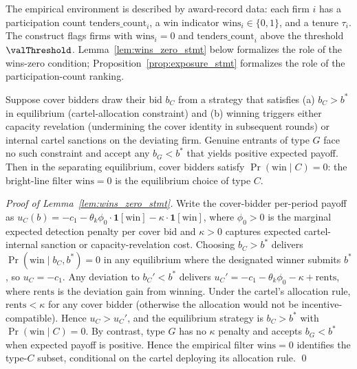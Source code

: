 The empirical environment is described by award-record data:
each firm $i$ has a participation count $\text{tenders\_count}_i$,
a win indicator $\text{wins}_i \in \{0, 1\}$, and a tenure $\tau_i$.
The construct flags firms with $\text{wins}_i = 0$ and
$\text{tenders\_count}_i$ above the threshold
$\valThreshold$. Lemma~\ref{lem:wins_zero_stmt} below formalizes
the role of the wins-zero condition;
Proposition~\ref{prop:exposure_stmt} formalizes the role of the
participation-count ranking.

\begin{lemma}\label{lem:wins_zero_stmt}
Suppose cover bidders draw their bid $b_C$ from a strategy that
satisfies (a) $b_C > b^*$ in equilibrium (cartel-allocation
constraint) and (b) winning triggers either capacity revelation
(undermining the cover identity in subsequent rounds) or internal
cartel sanctions on the deviating firm. Genuine entrants of type
$G$ face no such constraint and accept any $b_G < b^*$ that
yields positive expected payoff. Then in the separating
equilibrium, cover bidders satisfy
$\Pr(\text{win} \mid C) = 0$: the bright-line filter
$\text{wins}=0$ is the equilibrium choice of type $C$.
\end{lemma}

\begin{proof}[Proof of Lemma~\ref{lem:wins_zero_stmt}]
Write the cover-bidder per-period payoff as
$u_C(b) = -c_1 - \theta_k \phi_0 \cdot \mathbf{1}[\text{win}]
       - \kappa \cdot \mathbf{1}[\text{win}]$, where $\phi_0 > 0$
is the marginal expected detection penalty per cover bid and
$\kappa > 0$ captures expected cartel-internal sanction or
capacity-revelation cost. Choosing $b_C > b^*$ delivers
$\Pr(\text{win} \mid b_C, b^*) = 0$ in any equilibrium where the
designated winner submits $b^*$, so $u_C = -c_1$. Any deviation
to $b_C' < b^*$ delivers
$u_C' = -c_1 - \theta_k \phi_0 - \kappa + \mathrm{rents}$, where
$\mathrm{rents}$ is the deviation gain from winning. Under the
cartel's allocation rule, $\mathrm{rents} < \kappa$ for any cover
bidder (otherwise the allocation would not be
incentive-compatible). Hence $u_C > u_C'$, and the equilibrium
strategy is $b_C > b^*$ with $\Pr(\text{win} \mid C) = 0$. By
contrast, type $G$ has no $\kappa$ penalty and accepts $b_G < b^*$
when expected payoff is positive. Hence the empirical filter
$\text{wins} = 0$ identifies the type-$C$ subset, conditional on
the cartel deploying its allocation rule. \qed
\end{proof}

